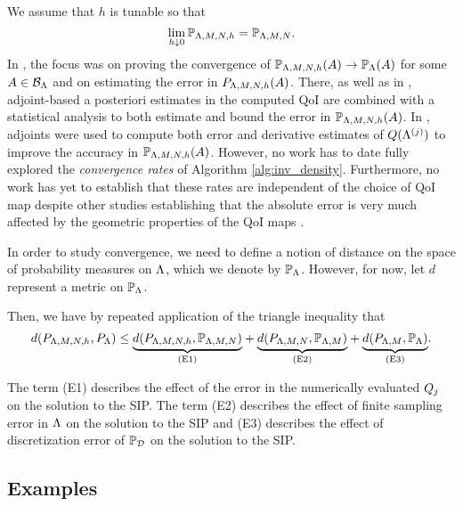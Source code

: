 We assume that $h$ is tunable so that
\[
\lim\limits_{h \downarrow 0} \mathbb{P}_{{\Lambda}, M, N, h} = \mathbb{P}_{{\Lambda}, M, N}.
\]
In \cite{BM17}, the focus was on proving the convergence of $\mathbb{P}_{{\Lambda}, M, N, h} (A) \to \mathbb{P}_{{\Lambda}} (A)$ for some $A\in \mathcal{B}_{{\Lambda}}$ and on estimating the error in $P_{{\Lambda}, M, N, h}(A)$.
There, as well as in \cite{BGE+15}, adjoint-based a posteriori estimates in the computed QoI are combined with a statistical analysis to both estimate and bound the error in $\mathbb{P}_{{\Lambda}, M, N, h} (A)$.
In \cite{BM17}, adjoints were used to compute both error and derivative estimates of $Q({\Lambda}^{(j)})$ to improve the accuracy in $\mathbb{P}_{{\Lambda}, M, N, h} (A)$.
However, no work has to date fully explored the \emph{convergence rates} of Algorithm \ref{alg:inv_density}.
Furthermore, no work has yet to establish that these rates are independent of the choice of QoI map despite other studies establishing that the absolute error is very much affected by the geometric properties of the QoI maps \cite{BE13}.

In order to study convergence, we need to define a notion of distance on the space of probability measures on ${\Lambda}$, which we denote by $\mathbb{P}_{\Lambda}$. 
However, for now, let $d$ represent a metric on $\mathbb{P}_{\Lambda}$.

Then, we have by repeated application of the triangle inequality that
\begin{equation}
\label{eq:triangleineq}
d(P_{{\Lambda}, M, N, h}, P_{\Lambda}) \leq 
\underset{ \text{(E1)} }{\underbrace{d(P_{{\Lambda}, M, N, h},\mathbb{P}_{{\Lambda}, M, N})}} + 
\underset{ \text{(E2)} }{\underbrace{d(P_{{\Lambda}, M, N}, \mathbb{P}_{{\Lambda}, M}) }}+ 
\underset{ \text{(E3)} }{\underbrace{d(P_{{\Lambda}, M}, \mathbb{P}_{\Lambda}) }}.
\end{equation}

The term (E1) describes the effect of the error in the numerically evaluated $Q_j$ on the solution to the SIP. 
The term (E2) describes the effect of finite sampling error in ${\Lambda}$ on the solution to the SIP and (E3) describes the effect of discretization error of $\mathbb{P}_{\mathcal{D}}$ on the solution to the SIP. 

\subsection{Examples}



